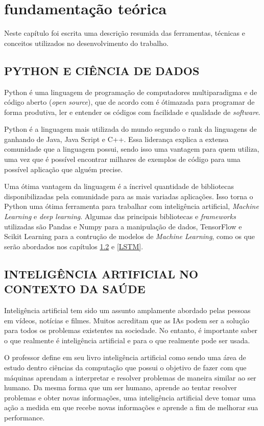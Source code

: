 \documentclass[
  12pt,		%
  a4paper,	%
  openright,%
  oneside,	%
  chapter=TITLE,		%
  section=TITLE,		%
  english,	%
  french,	%
  spanish,	%
  brazil	%
]{abntex2}
\begin{document}
    \chapter{fundamentação teórica}
    Neste capítulo foi escrita uma descrição resumida das ferramentas, técnicas e conceitos utilizados
    no desenvolvimento do trabalho.
    \section{PYTHON E CIÊNCIA DE DADOS}
    Python é uma linguagem de programação de computadores multiparadigma e de código aberto (\textit{open source}), 
    que de acordo com \cite[]{learning_python} é ótimazada para programar de forma produtiva, ler e entender os códigos
    com facilidade e qualidade de \textit{software}.

    Python é a linguagem mais utilizada do mundo segundo o rank da linguagens de \cite[]{PYPL} ganhando de Java, Java Script e C++. Essa liderança
    explica a extensa comunidade que a linguagem possui, sendo isso uma vantagem para quem utiliza, uma vez que é possível encontrar milhares
    de exemplos de código para uma possível aplicação que alguém precise.
    
    Uma ótima vantagem da linguagem é a íncrivel quantidade de bibliotecas disponibilizadas pela comunidade para as mais variadas aplicações. Isso
    torna o Python uma ótima ferramenta para trabalhar com inteligência artificial, \textit{Machine Learning} e \textit{deep learning}. Algumas das principais
    bibliotecas e \textit{frameworks} utilizadas são Pandas e Numpy para a manipulação de dados, TensorFlow e Scikit Learning para
    a contrução de modelos de \textit{Machine Learning}, como os que serão abordados nos capítulos \ref*{IA} e \ref*{LSTM}.
    
    \section{INTELIGÊNCIA ARTIFICIAL NO CONTEXTO DA SAÚDE}
    \label{IA}
    Inteligência artificial tem sido um assunto amplamente abordado pelas pessoas em vídeos, notícias e filmes. Muitos
    acreditam que as IAs podem ser a solução para todos os problemas existentes na sociedade. No entanto, é importante
    saber o que realmente é inteligência artificial e para o que realmente pode ser usada.

    O professor \cite[]{IA_python} define em seu livro inteligência artificial como sendo uma área de estudo dentro ciências da computação
    que possui o objetivo de fazer com que máquinas aprendam a interpretar e resolver problemas de maneira similar
    ao ser humano. Da mesma forma que um ser humano, aprende ao tentar resolver problemas e obter novas informações, uma inteligência artificial
    deve tomar uma ação a medida em que recebe novas informações e aprende a fim de melhorar sua performance.
\end{document}
